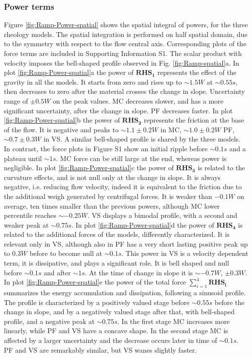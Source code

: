 \documentclass{article}
\begin{document}
\subsubsection{Power terms}
Figure \ref{fig:Ramp-Power-spatial} shows the spatial integral of powers, for the three rheology models. The spatial integration is performed on half spatial domain, due to the symmetry with respect to the flow central axis. Corresponding plots of the force terms are included in Supporting Information S1. The scalar product with velocity imposes the bell-shaped profile observed in Fig. \ref{fig:Ramp-spatial}a. In plot \ref{fig:Ramp-Power-spatial}a the power of $\boldsymbol{RHS_1}$ represents the effect of the gravity in all the models. It starts from zero and rises up to $\sim 1.5 W$ at $\sim 0.55 s$, then decreases to zero after the material crosses the change in slope. Uncertainty range of $\pm 0.5 W$ on the peak values. MC decreases slower, and has a more significant uncertainty, after the change in slope. PF decreases faster.  In plot \ref{fig:Ramp-Power-spatial}b the power of  $\boldsymbol{RHS_2}$ represents the friction at the base of the flow. It is negative and peaks to $\sim 1.1 \pm 0.2 W$ in MC, $\sim 1.0 \pm 0.2 W$ PF, $\sim 0.7 \pm 0.3 W$ in VS. A similar bell-shaped profile is shared by the three models. In contrast, the force plots in Figure S1 show an initial ripple before $\sim 0.1 s$ and a plateau until $\sim 1 s$. MC force can be still large at the end, whereas power is negligible. In plot \ref{fig:Ramp-Power-spatial}c the power of $\boldsymbol{RHS_3}$ is related to the curvature effects, and is not null only at the change in slope. It is always negative, i.e. reducing flow velocity, indeed it is equivalent to the friction due to the additional weigh generated by centrifugal forces. It is weaker than $-0.1 W$ on average, ten times smaller than the previous powers, although MC lower percentile reaches $\sim -0.25 W$. VS displays a bimodal profile, with a second and weaker peak at $\sim 0.75 s$. In plot \ref{fig:Ramp-Power-spatial}d the power of $\boldsymbol{RHS_4}$ is related to the additional forces of the models, differently characterized. It is relevant only in VS, although also in PF has a very short lasting positive peak up to $0.3 W$ before to become null at $\sim 0.1 s$. This power in VS is a velocity dependent term, it is dissipative, and plays a significant role. It is bell shaped and null before $\sim 0.1 s$ and after $\sim 1 s$. At the time of change in slope it is $\sim -0.7 W$, $\pm 0.3 W$. In plot \ref{fig:Ramp-Power-spatial}e the power of the total force $\sum^4_{i=1}\boldsymbol{RHS_i}$ summarizes the energy accumulation and dissipation, following a sinusoid profile. The profile is characterized by a positively valued stage before $\sim 0.55 s$ before the change in slope, and by a negatively valued stage after that, with bell-shaped profile, and a negative peak at $\sim 0.75 s$. In the first stage MC increases more linearly, while PF and VS have a concave shape. In the second stage MC is affected by a larger uncertainty and the decrease occurs later in time of $\sim 0.1 s$. PF and VS are remarkably similar, but VS wanes slightly faster.
\end{document}
